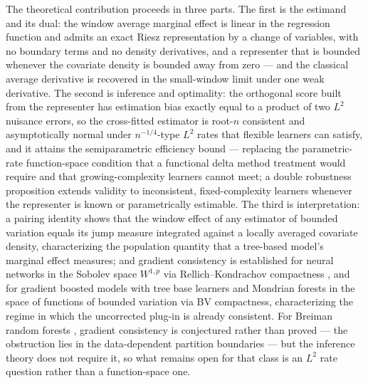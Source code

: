 \documentclass[12pt]{article}
\begin{document}
	The theoretical contribution proceeds in three parts. The first is the estimand
	and its dual: the window average marginal effect is linear in the regression
	function and admits an exact Riesz representation by a change of variables, with no boundary terms and no density derivatives, and a representer that is bounded whenever the covariate density is bounded away from zero --- and the
	classical average derivative is recovered in the small-window limit under one weak
	derivative. The second is inference and optimality: the orthogonal score built
	from the representer has estimation bias exactly equal to a product of two $L^2$
	nuisance errors, so the cross-fitted estimator is root-$n$ consistent and
	asymptotically normal under $n^{-1/4}$-type $L^2$ rates that flexible learners can
	satisfy, and it attains the semiparametric efficiency bound --- replacing the
	parametric-rate function-space condition that a functional delta method treatment
	would require and that growing-complexity learners cannot meet; a double
	robustness proposition extends validity to inconsistent, fixed-complexity
	learners whenever the representer is known or parametrically estimable. The third is
	interpretation: a pairing identity shows that the window effect of any estimator
	of bounded variation equals its jump measure integrated against a locally averaged
	covariate density, characterizing the population quantity that a tree-based
	model's marginal effect measures; and gradient consistency is established for
	neural networks in the Sobolev space $W^{1,p}$ via Rellich--Kondrachov compactness
	\citep{evans2010pde}, and for gradient boosted models with tree base learners and
	Mondrian forests \citep{mourtada2017mondrian} in the space of functions of bounded
	variation \citep{ambrosio2000bv} via BV compactness, characterizing the regime in
	which the uncorrected plug-in is already consistent. For Breiman random forests
	\citep{breiman2001rf, scornet2015forests}, gradient consistency is conjectured
	rather than proved --- the obstruction lies in the data-dependent partition
	boundaries --- but the inference theory does not require it, so what remains open
	for that class is an $L^2$ rate question rather than a function-space one.
	
\end{document}
